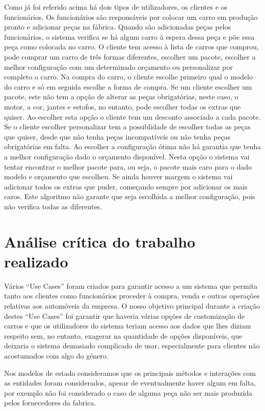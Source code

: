 \documentclass[10pt, a4paper]{article}
\begin{document}
Como já foi referido acima há dois tipos de utilizadores, os clientes e os funcionários. Os funcionários são responsáveis por colocar um carro em produção pronto e adicionar peças na fábrica. Quando são adicionadas peças pelos funcionários, o sistema verifica se há algum carro à espera dessa peça e põe essa peça como colocada no carro. O cliente tem acesso à lista de carros que comprou, pode comprar um carro de três formas diferentes, escolher um pacote, escolher a melhor configuração com um determinado orçamento ou personalizar por completo o carro. Na compra do carro, o cliente escolhe primeiro qual o modelo do carro e só em seguida escolhe a forma de compra. Se um cliente escolher um pacote, este não tem a opção de alterar as peças obrigatórias, neste caso, o motor, a cor, jantes e estofos, no entanto, pode escolher todas os extras que quiser. Ao escolher esta opção o cliente tem um desconto associado a cada pacote. Se o cliente escolher personalizar tem a possiblidade de escolher todas as peças que quiser, desde que não tenha peças incompatíveis ou não tenha peças obrigatórias em falta. Ao escolher a configuração ótima não há garantia que tenha a melhor configuração dado o orçamento disponível. Nesta opção o sistema vai tentar encontrar o melhor pacote para, ou seja, o pacote mais caro para o dado modelo e orçamento que escolheu. Se ainda houver margem o sistema vai adicionar todos os extras que puder, começando sempre por adicionar os mais caros. Este algoritmo não garante que seja escolhida a melhor configuração, pois não verifica todas as diferentes.

\newpage
\section{Análise crítica do trabalho realizado}\label{analise}
Vários “Use Cases” foram criados para garantir acesso a um sistema que permita tanto aos clientes como funcionários proceder à compra, venda e outras operações relativas aos automóveis da empresa. O nosso objetivo principal durante a criação destes “Use Cases” foi garantir que haveria várias opções de customização de carros e que os utilizadores do sistema teriam acesso aos dados que lhes diziam respeito sem, no entanto, exagerar na quantidade de opções disponíveis, que deixaria o sistema demasiado complicado de usar, especialmente para clientes não acostumados com algo do género.

Nos modelos de estado consideramos que os principais métodos e interações com as entidades foram considerados, apesar de eventualmente haver algum em falta, por exemplo não foi considerado o caso de alguma peça não ser mais produzida pelos fornecedores da fabrica.
\end{document}
